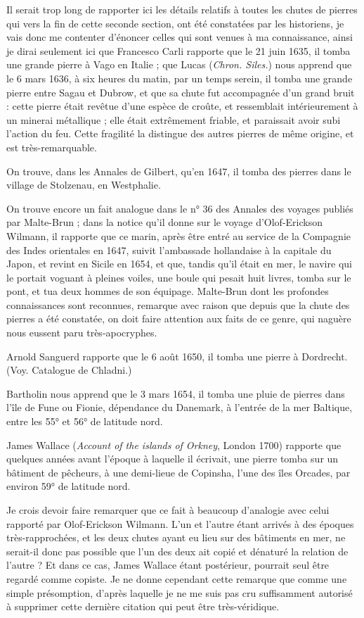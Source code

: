 \documentclass[a4paper, 12pt, oneside, french]{article}
\begin{document}
Il serait trop long de rapporter ici les détails relatifs à toutes les chutes de pierres qui vers la fin de cette seconde section, ont été constatées par les historiens, je vais donc me contenter d'énoncer celles qui sont venues à ma connaissance, ainsi je dirai seulement ici que Francesco Carli rapporte que le 21 juin 1635, il tomba une grande pierre à Vago en Italie ; que Lucas (\emph{Chron. Siles.}) nous apprend que le 6 mars 1636, à six heures du matin, par un temps serein, il tomba une grande pierre entre Sagau et Dubrow, et que sa chute fut accompagnée d'un grand bruit : cette pierre était revêtue d'une espèce de croûte, et ressemblait intérieurement à un minerai métallique ; elle était extrêmement friable, et paraissait avoir subi l'action du feu. Cette fragilité la distingue des autres pierres de même origine, et est très-remarquable.

On trouve, dans les Annales de Gilbert, qu'en 1647, il tomba des pierres dans le village de Stolzenau, en Westphalie.

On trouve encore un fait analogue dans le n° 36 des Annales des voyages publiés par Malte-Brun ; dans la notice qu'il donne sur le voyage d'Olof-Erickson Wilmann, il rapporte que ce marin, après être entré au service de la Compagnie des Indes orientales en 1647, suivit l'ambassade hollandaise à la capitale du Japon, et revint en Sicile en 1654, et que, tandis qu'il était en mer, le navire qui le portait voguant à pleines voiles, une boule qui pesait huit livres, tomba sur le pont, et tua deux hommes de son équipage. Malte-Brun dont les profondes connaissances sont reconnues, remarque avec raison que depuis que la chute des pierres a été constatée, on doit faire attention aux faits de ce genre, qui naguère nous eussent paru très-apocryphes.

Arnold Sanguerd rapporte que le 6 août 1650, il tomba une pierre à Dordrecht. (Voy. Catalogue de Chladni.)

Bartholin nous apprend que le 3 mars 1654, il tomba une pluie de pierres dans l'île de Fune ou Fionie, dépendance du Danemark, à l'entrée de la mer Baltique, entre les 55° et 56° de latitude nord.

James Wallace (\emph{Account of the islands of Orkney}, London 1700) rapporte que quelques années avant l'époque à laquelle il écrivait, une pierre tomba sur un bâtiment de pêcheurs, à une demi-lieue de Copinsha, l'une des îles Orcades, par environ 59° de latitude nord.

Je crois devoir faire remarquer que ce fait à beaucoup d'analogie avec celui rapporté par Olof-Erickson Wilmann. L'un et l'autre étant arrivés à des époques très-rapprochées, et les deux chutes ayant eu lieu sur des bâtiments en mer, ne serait-il donc pas possible que l'un des deux ait copié et dénaturé la relation de l'autre ? Et dans ce cas, James Wallace étant postérieur, pourrait seul être regardé comme copiste. Je ne donne cependant cette remarque que comme une simple présomption, d'après laquelle je ne me suis pas cru suffisamment autorisé à supprimer cette dernière citation qui peut être très-véridique.
\end{document}
